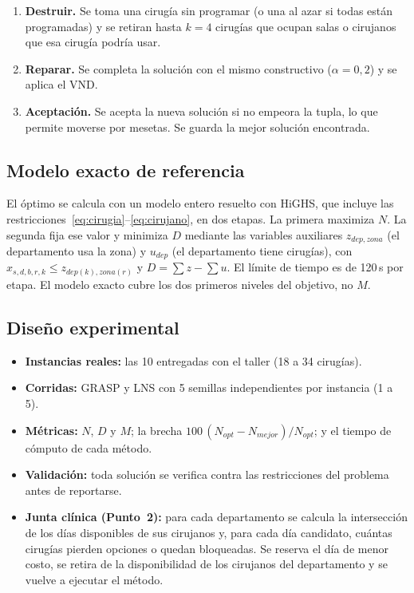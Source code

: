 \begin{enumerate}
	\item \textbf{Destruir.} Se toma una cirugía sin programar (o una al azar si todas están programadas) y se retiran hasta $k=4$ cirugías que ocupan salas o cirujanos que esa cirugía podría usar.
	\item \textbf{Reparar.} Se completa la solución con el mismo constructivo ($\alpha=0{,}2$) y se aplica el VND.
	\item \textbf{Aceptación.} Se acepta la nueva solución si no empeora la tupla, lo que permite moverse por mesetas. Se guarda la mejor solución encontrada.
\end{enumerate}

\subsection{Modelo exacto de referencia}

El óptimo se calcula con un modelo entero resuelto con HiGHS, que incluye las restricciones~\eqref{eq:cirugia}--\eqref{eq:cirujano}, en dos etapas. La primera maximiza $N$. La segunda fija ese valor y minimiza $D$ mediante las variables auxiliares $z_{dep,zona}$ (el departamento usa la zona) y $u_{dep}$ (el departamento tiene cirugías), con $x_{s,d,b,r,k}\le z_{dep(k),zona(r)}$ y $D=\sum z-\sum u$. El límite de tiempo es de 120\,s por etapa. El modelo exacto cubre los dos primeros niveles del objetivo, no $M$.

\subsection{Diseño experimental}

\begin{itemize}
	\item \textbf{Instancias reales:} las 10 entregadas con el taller (18 a 34 cirugías).
	\item \textbf{Corridas:} GRASP y LNS con 5 semillas independientes por instancia (1 a 5).
	\item \textbf{Métricas:} $N$, $D$ y $M$; la brecha $100\,(N_{opt}-N_{mejor})/N_{opt}$; y el tiempo de cómputo de cada método.
	\item \textbf{Validación:} toda solución se verifica contra las restricciones del problema antes de reportarse.
	\item \textbf{Junta clínica (Punto~2):} para cada departamento se calcula la intersección de los días disponibles de sus cirujanos y, para cada día candidato, cuántas cirugías pierden opciones o quedan bloqueadas. Se reserva el día de menor costo, se retira de la disponibilidad de los cirujanos del departamento y se vuelve a ejecutar el método.
\end{itemize}